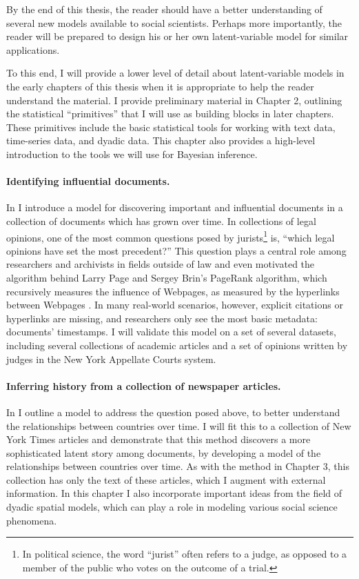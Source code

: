 By the end of this thesis, the reader should have a better
understanding of several new models available to social scientists.
Perhaps more importantly, the reader will be prepared to design his or
her own latent-variable model for similar applications.

To this end, I will provide a lower level of detail about
latent-variable models in the early chapters of this thesis when it is
appropriate to help the reader understand the material.  I provide
preliminary material in Chapter 2, outlining the statistical
``primitives'' that I will use as building blocks in later chapters.
These primitives include the basic statistical tools for working with
text data, time-series data, and dyadic data.  This chapter also
provides a high-level introduction to the tools we will use for
Bayesian inference.

\paragraph{Identifying influential documents.} In  I
introduce a model for discovering important and influential documents
in a collection of documents which has grown over time.  In
collections of legal opinions, one of the most common questions posed
by jurists\footnote{In political science, the word ``jurist'' often
  refers to a judge, as opposed to a member of the public who votes on
  the outcome of a trial.} is, ``which legal opinions have set the
most precedent?''  This question plays a central role among
researchers and archivists in fields outside of law and even motivated
the algorithm behind Larry Page and Sergey Brin's PageRank algorithm,
which recursively measures the influence of Webpages, as measured by
the hyperlinks between Webpages
\citep{garfield:1992,brin:1998,garfield:2002}.  In many real-world
scenarios, however, explicit citations or hyperlinks are missing, and
researchers only see the most basic metadata: documents' timestamps.
I will validate this model on a set of several datasets, including
several collections of academic articles and a set of opinions written
by judges in the New York Appellate Courts system.

\paragraph{Inferring history from a collection of newspaper articles.}
In  I outline a model to address the question
posed above, to better understand the relationships between countries
over time.  I will fit this to a collection of New York Times articles
and demonstrate that this method discovers a more sophisticated latent
story among documents, by developing a model of the relationships
between countries over time.  As with the method in Chapter 3, this
collection has only the text of these articles, which I augment with
external information.  In this chapter I also incorporate important
ideas from the field of dyadic spatial models, which can play a role
in modeling various social science phenomena.


